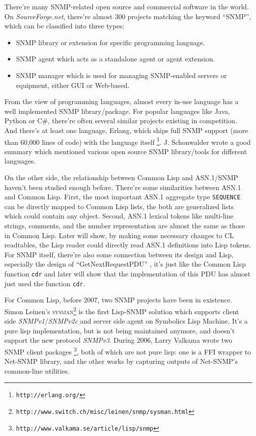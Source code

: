 \documentclass[reprint,natbib,9pt]{sigplanconf}
\begin{document}
There're many SNMP-related open source and commercial software in the
world. On \textsl{SourceForge.net}, there're almost 300 projects
matching the keyword ``SNMP'', which can be classified into three
types:
\begin{itemize}
\item SNMP library or extension for specific programming language.
\item SNMP agent which acts as a standalone agent or agent extension.
\item SNMP manager which is used for managing SNMP-enabled servers or
  equipment, either GUI or Web-based.
\end{itemize}

From the view of programming languages, almost every in-use language
has a well implemented SNMP library/package. For popular languages
like Java, Python or C\#, there're often several similar projects
existing in competition. And there's at least one language, Erlang,
which ships full SNMP support (more than 60,000 lines of code) with
the language itself \footnote{\texttt{http://erlang.org/}}.
J. Schonwalder wrote a good summary \cite{Schonwalder2002}
which mentioned various open source SNMP library/tools for different languages.

On the other side, the relationship between Common Lisp and ASN.1/SNMP
haven't been studied enough before. There're some similarities between
ASN.1 and Common Lisp. First, the most important ASN.1 aggregate
type \texttt{SEQUENCE} can be directly mapped to Common Lisp lists,
the both are generalized lists which could contain any object. Second,
ASN.1 lexical tokens like multi-line strings, comments, and the number
representation are almost the same as those in Common Lisp. Later will show,
by making some necessary changes to CL readtables, the Lisp reader
could directly read ASN.1 definitions into Lisp tokens. For SNMP itself,
there're also some connection between its design and Lisp, especially the
design of ``GetNextRequestPDU'' \cite{RFC:3416},
it's just like the Common Lisp function
\texttt{cdr} and later will show that the implementation of this PDU has
almost just used the function \texttt{cdr}.

For Common Lisp, before 2007, two SNMP projects have been in
existence. Simon Leinen's
\textsc{sysman}\footnote{\texttt{http://www.switch.ch/misc/leinen/snmp/sysman.html}}
is the first Lisp-SNMP solution which supports client side
\textsl{SNMPv1}/\textsl{SNMPv2c} and server side agent on
Symbolics Lisp Machine. It's a pure lisp implementation, but
is not being maintained anymore, and doesn't support the new protocol \textsl{SNMPv3}.
During 2006, Larry Valkama wrote two SNMP client packages
\footnote{\texttt{http://www.valkama.se/article/lisp/snmp}},
both of which are not pure lisp:
one is a FFI wrapper to Net-SNMP library, and the other works
by capturing outputs of Net-SNMP's common-line utilities.
\end{document}
